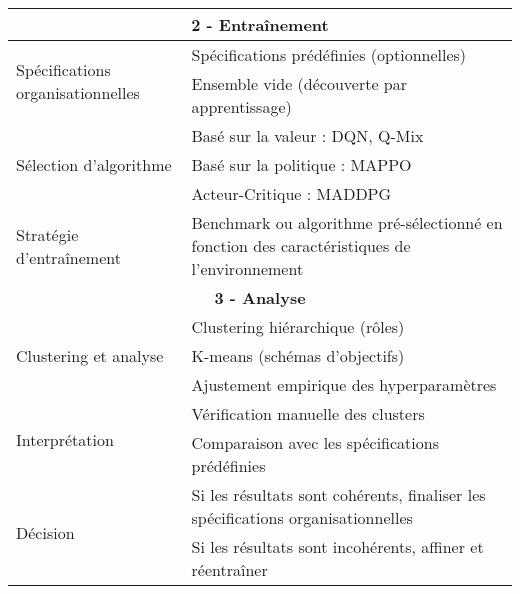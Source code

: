 \begin{table}[h!]
\begin{tabular}{|l|p{10cm}|}
        \multicolumn{2}{|c|}{\textbf{2 - Entraînement}}                                                                                       \\ \hline
        \multirow{2}{*}{Spécifications organisationnelles}
                                                & Spécifications prédéfinies (optionnelles)                                                   \\
                                                & Ensemble vide (découverte par apprentissage)                                                \\ \hline
        \multirow{3}{*}{Sélection d'algorithme}
                                                & Basé sur la valeur : DQN, Q-Mix                                                             \\
                                                & Basé sur la politique : MAPPO                                                               \\
                                                & Acteur-Critique : MADDPG                                                                    \\ \hline
        Stratégie d'entraînement                & Benchmark ou algorithme pré-sélectionné en fonction des caractéristiques de l'environnement \\ \hline

        \multicolumn{2}{|c|}{\textbf{3 - Analyse}}                                                                                            \\ \hline
        \multirow{3}{*}{Clustering et analyse}
                                                & Clustering hiérarchique (rôles)                                                             \\
                                                & K-means (schémas d'objectifs)                                                               \\
                                                & Ajustement empirique des hyperparamètres                                                    \\ \hline
        \multirow{2}{*}{Interprétation}
                                                & Vérification manuelle des clusters                                                          \\
                                                & Comparaison avec les spécifications prédéfinies                                             \\ \hline
        \multirow{2}{*}{Décision}
                                                & Si les résultats sont cohérents, finaliser les spécifications organisationnelles            \\
                                                & Si les résultats sont incohérents, affiner et réentraîner                                   \\ \hline


\end{tabular}
\end{table}
